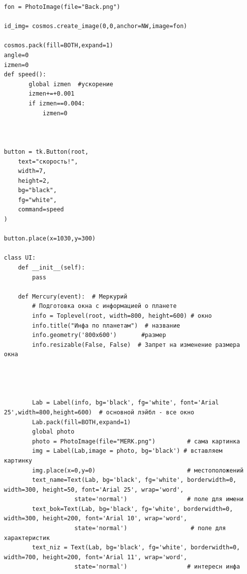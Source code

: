 \documentclass[11pt,a4paper]{report}
\begin{document}
\begin{verbatim}
fon = PhotoImage(file="Back.png")

id_img= cosmos.create_image(0,0,anchor=NW,image=fon)

cosmos.pack(fill=BOTH,expand=1)
angle=0
izmen=0
def speed():
       global izmen  #ускорение 
       izmen+=+0.001 
       if izmen==0.004:
           izmen=0
       
       
       
button = tk.Button(root,
    text="скорость!",
    width=7,
    height=2,
    bg="black",
    fg="white",
    command=speed
)
 
button.place(x=1030,y=300)

class UI:
    def __init__(self):
        pass

    def Mercury(event):  # Меркурий
        # Подготовка окна с информацией о планете
        info = Toplevel(root, width=800, height=600) # окно
        info.title("Инфа по планетам")  # название
        info.geometry('800x600')       #размер
        info.resizable(False, False)  # Запрет на изменение размера окна
        
        
        
    
        Lab = Label(info, bg='black', fg='white', font='Arial 25',width=800,height=600)  # основной лэйбл - все окно
        Lab.pack(fill=BOTH,expand=1)
        global photo
        photo = PhotoImage(file="MERK.png")         # сама картинка
        img = Label(Lab,image = photo, bg='black') # вставляем картинку
        img.place(x=0,y=0)                          # местоположений
        text_name=Text(Lab, bg='black', fg='white', borderwidth=0, width=300, height=50, font='Arial 25', wrap='word',
                    state='normal')                 # поле для имени
        text_bok=Text(Lab, bg='black', fg='white', borderwidth=0, width=300, height=200, font='Arial 10', wrap='word',
                    state='normal')                  # поле для характеристик
        text_niz = Text(Lab, bg='black', fg='white', borderwidth=0, width=700, height=200, font='Arial 11', wrap='word',
                    state='normal')                 # интересн инфа
    

\end{verbatim}
\end{document}
